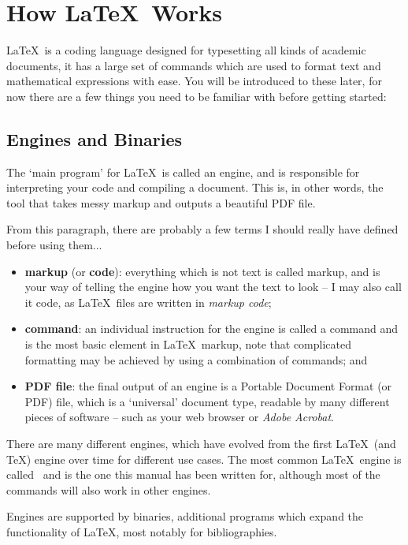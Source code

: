 \documentclass{book}
\begin{document}
{
  \hypersetup{linkcolor=black}
  \tableofcontents
}

\mainmatter
\pagestyle{headings}
\chapter{How \LaTeX\ Works}
\LaTeX\ is a coding language designed for typesetting all kinds of academic documents, it has a large set of commands which are used to format text and mathematical expressions with ease. You will be introduced to these later, for now there are a few things you need to be familiar with before getting started:

\section{Engines and Binaries}
The `main program' for \LaTeX\ is called an engine, and is responsible for interpreting your code and compiling a document. This is, in other words, the tool that takes messy markup and outputs a beautiful PDF file.

From this paragraph, there are probably a few terms I should really have defined before using them...
\begin{itemize}
  \item \textbf{markup} (or \textbf{code}): everything which is not text is called markup, and is your way of telling the engine how you want the text to look -- I may also call it code, as \LaTeX\ files are written in \textit{markup code};
  \item \textbf{command}: an individual instruction for the engine is called a command and is the most basic element in \LaTeX\ markup,  note that complicated formatting may be achieved by using a combination of commands; and
  \item \textbf{PDF file}: the final output of an engine is a Portable Document Format (or PDF) file, which is a `universal' document type, readable by many different pieces of software -- such as your web browser or \textit{Adobe Acrobat}.
\end{itemize}
There are many different engines, which have evolved from the first \LaTeX\ (and \TeX) engine over time for different use cases. The most common \LaTeX\ engine is called \pdfLaTeX\ and is the one this manual has been written for, although most of the commands will also work in other engines.

Engines are supported by binaries, additional programs which expand the functionality of \LaTeX, most notably for bibliographies.
\end{document}
